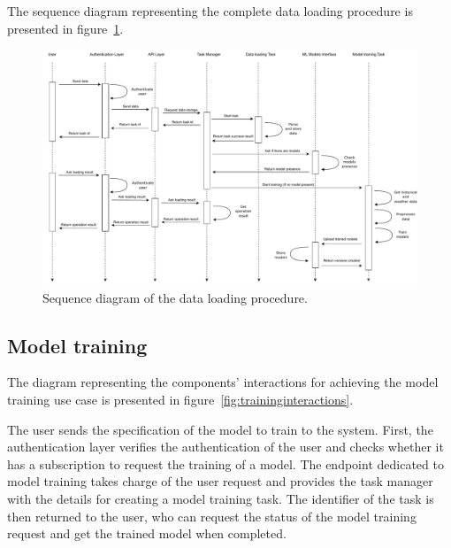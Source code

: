 The sequence diagram representing the complete data loading procedure is presented in figure~\ref{fig:loadingsequence}.

\begin{figure}[H]
\centering
\includegraphics[width=1\textwidth]{images/architecture_data_loading_sequence}
\caption{Sequence diagram of the data loading procedure.}
\label{fig:loadingsequence}
\end{figure}


\vspace{0.1 cm}
\subsection{Model training}
\label{sec:training}
\vspace{0.1 cm}

The diagram representing the components' interactions for achieving the model training use case is presented in figure~\ref{fig:traininginteractions}.

The user sends the specification of the model to train to the system.
First, the authentication layer verifies the authentication of the user and checks whether it has a subscription to request the training of a model.
The endpoint dedicated to model training takes charge of the user request and provides the task manager with the details for creating a model training task.
The identifier of the task is then returned to the user, who can request the status of the model training request and get the trained model when completed.

